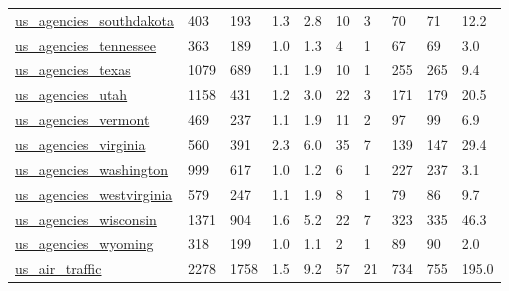 \begin{longtable}{llllllllll}
 \href{http://govmaps.cid.hks.harvard.edu}{us\_agencies\_southdakota}                                                         & 403        & 193   & 1.3    & 2.8    & 10    & 3      & 70     & 71     & 12.2    \\
 \href{http://govmaps.cid.hks.harvard.edu}{us\_agencies\_tennessee}                                                           & 363        & 189   & 1.0    & 1.3    & 4     & 1      & 67     & 69     & 3.0     \\
 \href{http://govmaps.cid.hks.harvard.edu}{us\_agencies\_texas}                                                               & 1079       & 689   & 1.1    & 1.9    & 10    & 1      & 255    & 265    & 9.4     \\
 \href{http://govmaps.cid.hks.harvard.edu}{us\_agencies\_utah}                                                                & 1158       & 431   & 1.2    & 3.0    & 22    & 3      & 171    & 179    & 20.5    \\
 \href{http://govmaps.cid.hks.harvard.edu}{us\_agencies\_vermont}                                                             & 469        & 237   & 1.1    & 1.9    & 11    & 2      & 97     & 99     & 6.9     \\
 \href{http://govmaps.cid.hks.harvard.edu}{us\_agencies\_virginia}                                                            & 560        & 391   & 2.3    & 6.0    & 35    & 7      & 139    & 147    & 29.4    \\
 \href{http://govmaps.cid.hks.harvard.edu}{us\_agencies\_washington}                                                          & 999        & 617   & 1.0    & 1.2    & 6     & 1      & 227    & 237    & 3.1     \\
 \href{http://govmaps.cid.hks.harvard.edu}{us\_agencies\_westvirginia}                                                        & 579        & 247   & 1.1    & 1.9    & 8     & 1      & 79     & 86     & 9.7     \\
 \href{http://govmaps.cid.hks.harvard.edu}{us\_agencies\_wisconsin}                                                           & 1371       & 904   & 1.6    & 5.2    & 22    & 7      & 323    & 335    & 46.3    \\
 \href{http://govmaps.cid.hks.harvard.edu}{us\_agencies\_wyoming}                                                             & 318        & 199   & 1.0    & 1.1    & 2     & 1      & 89     & 90     & 2.0     \\
 \href{https://www.transtats.bts.gov/DL_SelectFields.asp?Table_ID=310}{us\_air\_traffic}                                      & 2278       & 1758  & 1.5    & 9.2    & 57    & 21     & 734    & 755    & 195.0   \\

\end{longtable}
